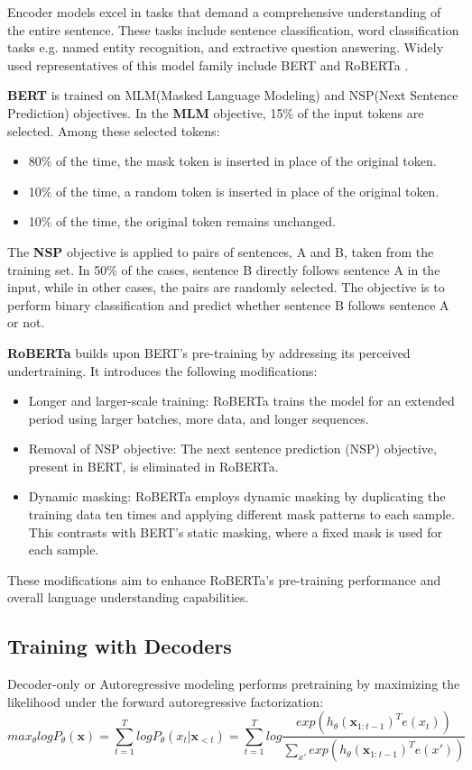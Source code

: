 Encoder models excel in tasks that demand a comprehensive understanding of the entire sentence. These tasks include sentence classification, word classification tasks e.g. named entity recognition, and extractive question answering. Widely used representatives of this model family include BERT \cite{devlin2018bert} and RoBERTa \cite{liu2019roberta}.

\textbf{BERT} \cite{devlin2018bert} is trained on MLM(Masked Language Modeling) and NSP(Next Sentence Prediction) objectives.
In the \textbf{MLM} objective, 15\% of the input tokens are selected. Among these selected tokens:
\begin{itemize}
    \item 80\% of the time, the mask token is inserted in place of the original token.
    \item 10\% of the time, a random token is inserted in place of the original token.
    \item 10\% of the time, the original token remains unchanged.
\end{itemize}
The \textbf{NSP} objective is applied to pairs of sentences, A and B, taken from the training set. In 50\% of the cases, sentence B directly follows sentence A in the input, while in other cases, the pairs are randomly selected. The objective is to perform binary classification and predict whether sentence B follows sentence A or not.

\textbf{RoBERTa} \cite{liu2019roberta} builds upon BERT's pre-training by addressing its perceived undertraining. It introduces the following modifications:
\begin{itemize}
    \item Longer and larger-scale training: RoBERTa trains the model for an extended period using larger batches, more data, and longer sequences.
    \item Removal of NSP objective: The next sentence prediction (NSP) objective, present in BERT, is eliminated in RoBERTa.
    \item Dynamic masking: RoBERTa employs dynamic masking by duplicating the training data ten times and applying different mask patterns to each sample. This contrasts with BERT's static masking, where a fixed mask is used for each sample.
\end{itemize}
These modifications aim to enhance RoBERTa's pre-training performance and overall language understanding capabilities.




\subsection{Training with Decoders}
Decoder-only or Autoregressive modeling performs
pretraining by maximizing the likelihood under the forward autoregressive factorization:
$$
max_{\theta}logP_{\theta}(\textbf{x})=\sum_{t=1}^TlogP_{\theta}(x_t|\textbf{x}_{<t})
= \sum_{t=1}^T{log\frac{exp(h_{\theta}(\textbf{x}_{1:t-1})^Te(x_t))}{\sum_{x\prime}exp(h_{\theta}(\textbf{x}_{1:t-1})^Te(x\prime))}}
$$

